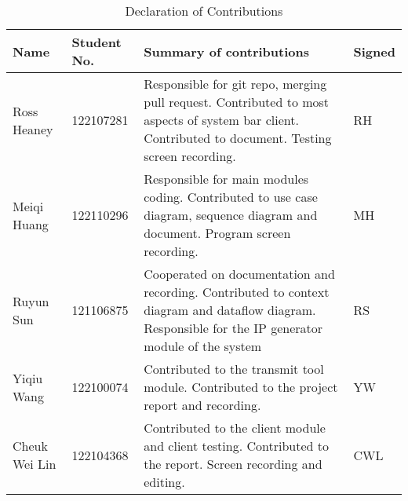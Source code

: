 

\begin{table}
    \centering
    \caption{Declaration of Contributions}

    \begin{tabular}{|p{2cm}|p{2cm}|p{8cm}|p{1.5cm}|}
    \hline
    Name & Student No. & Summary of contributions & Signed \\
    \hline
         Ross Heaney & 122107281 & 
         Responsible for git repo, merging pull request. Contributed to most aspects of system bar client. Contributed to document. Testing screen recording. & RH \\
    \hline
        Meiqi Huang & 122110296 & Responsible for main modules coding. Contributed to use case diagram, sequence diagram and document. Program screen recording. & MH\\
    \hline
        Ruyun Sun & 121106875 & Cooperated on documentation and recording. Contributed to context diagram and dataflow diagram. Responsible for the IP generator module of the system & RS \\
    \hline 
        Yiqiu Wang & 122100074 & Contributed to the transmit tool module. Contributed to the project report and recording. & YW \\
    \hline
        Cheuk Wei Lin & 122104368 & Contributed to the client module and client testing. Contributed to the report. Screen recording and editing. & CWL \\
    \hline
    \end{tabular}
    
\end{table}